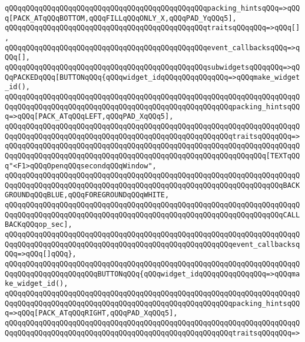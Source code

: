 \verb|qQQqqQQqqQQqqQQqqQQqqQQqqQQqqQQqqQQqqQQqqQQqqQQqpacking_hintsqQQq=>qQQq[PACK_ATqQQqBOTTOM,qQQqFILLqQQqONLY_X,qQQqPAD_YqQQq5],|\newline
\verb|qQQqqQQqqQQqqQQqqQQqqQQqqQQqqQQqqQQqqQQqqQQqqQQqtraitsqQQqqQQq=>qQQq[],|\newline
\verb|qQQqqQQqqQQqqQQqqQQqqQQqqQQqqQQqqQQqqQQqqQQqqQQqevent_callbacksqQQq=>qQQq[],|\newline
\verb|qQQqqQQqqQQqqQQqqQQqqQQqqQQqqQQqqQQqqQQqqQQqqQQqsubwidgetsqQQqqQQq=>qQQqPACKEDqQQq[BUTTONqQQq{qQQqwidget_idqQQqqQQqqQQqqQQq=>qQQqmake_widget_id(),|\newline
\verb|qQQqqQQqqQQqqQQqqQQqqQQqqQQqqQQqqQQqqQQqqQQqqQQqqQQqqQQqqQQqqQQqqQQqqQQqqQQqqQQqqQQqqQQqqQQqqQQqqQQqqQQqqQQqqQQqqQQqqQQqqQQqpacking_hintsqQQq=>qQQq[PACK_ATqQQqLEFT,qQQqPAD_XqQQq5],|\newline
\verb|qQQqqQQqqQQqqQQqqQQqqQQqqQQqqQQqqQQqqQQqqQQqqQQqqQQqqQQqqQQqqQQqqQQqqQQqqQQqqQQqqQQqqQQqqQQqqQQqqQQqqQQqqQQqqQQqqQQqqQQqqQQqtraitsqQQqqQQq=>|\newline
\verb|qQQqqQQqqQQqqQQqqQQqqQQqqQQqqQQqqQQqqQQqqQQqqQQqqQQqqQQqqQQqqQQqqQQqqQQqqQQqqQQqqQQqqQQqqQQqqQQqqQQqqQQqqQQqqQQqqQQqqQQqqQQqqQQqqQQq[TEXTqQQq"<F1>qQQqOpenqQQqsecondqQQqWindow",|\newline
\verb|qQQqqQQqqQQqqQQqqQQqqQQqqQQqqQQqqQQqqQQqqQQqqQQqqQQqqQQqqQQqqQQqqQQqqQQqqQQqqQQqqQQqqQQqqQQqqQQqqQQqqQQqqQQqqQQqqQQqqQQqqQQqqQQqqQQqqQQqBACKGROUNDqQQqBLUE,qQQqFOREGROUNDqQQqWHITE,|\newline
\verb|qQQqqQQqqQQqqQQqqQQqqQQqqQQqqQQqqQQqqQQqqQQqqQQqqQQqqQQqqQQqqQQqqQQqqQQqqQQqqQQqqQQqqQQqqQQqqQQqqQQqqQQqqQQqqQQqqQQqqQQqqQQqqQQqqQQqqQQqCALLBACKqQQqop_sec],|\newline
\verb|qQQqqQQqqQQqqQQqqQQqqQQqqQQqqQQqqQQqqQQqqQQqqQQqqQQqqQQqqQQqqQQqqQQqqQQqqQQqqQQqqQQqqQQqqQQqqQQqqQQqqQQqqQQqqQQqqQQqqQQqqQQqevent_callbacksqQQq=>qQQq[]qQQq},|\newline
\verb|qQQqqQQqqQQqqQQqqQQqqQQqqQQqqQQqqQQqqQQqqQQqqQQqqQQqqQQqqQQqqQQqqQQqqQQqqQQqqQQqqQQqqQQqqQQqBUTTONqQQq{qQQqwidget_idqQQqqQQqqQQqqQQq=>qQQqmake_widget_id(),|\newline
\verb|qQQqqQQqqQQqqQQqqQQqqQQqqQQqqQQqqQQqqQQqqQQqqQQqqQQqqQQqqQQqqQQqqQQqqQQqqQQqqQQqqQQqqQQqqQQqqQQqqQQqqQQqqQQqqQQqqQQqqQQqqQQqpacking_hintsqQQq=>qQQq[PACK_ATqQQqRIGHT,qQQqPAD_XqQQq5],|\newline
\verb|qQQqqQQqqQQqqQQqqQQqqQQqqQQqqQQqqQQqqQQqqQQqqQQqqQQqqQQqqQQqqQQqqQQqqQQqqQQqqQQqqQQqqQQqqQQqqQQqqQQqqQQqqQQqqQQqqQQqqQQqqQQqtraitsqQQqqQQq=>|\newline
